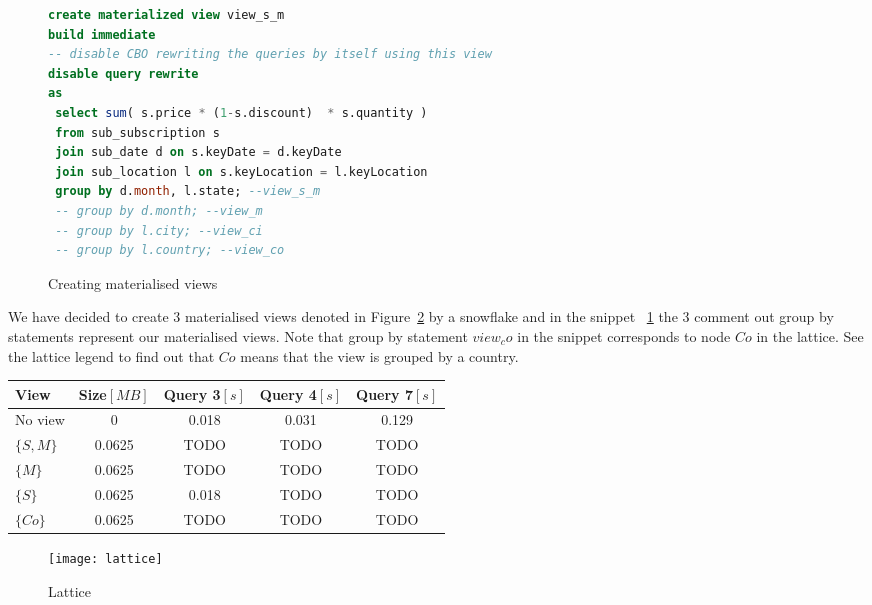 \begin{figure}[!hbp]
\begin{lstlisting}[language=sql] 
create materialized view view_s_m 
build immediate  
-- disable CBO rewriting the queries by itself using this view
disable query rewrite 
as 
 select sum( s.price * (1-s.discount)  * s.quantity )  
 from sub_subscription s
 join sub_date d on s.keyDate = d.keyDate
 join sub_location l on s.keyLocation = l.keyLocation
 group by d.month, l.state; --view_s_m
 -- group by d.month; --view_m
 -- group by l.city; --view_ci
 -- group by l.country; --view_co

\end{lstlisting}
\caption{\label{s:views}  Creating materialised views}
\end{figure}

We have decided to create 3 materialised views denoted in Figure~\ref{fig:lattice}
by a snowflake and in the snippet ~\ref{s:views} the 3 comment out group by statements represent 
our materialised views. Note that group by statement  $view_co$ in the snippet 
corresponds to node ${Co}$ in the lattice. See the lattice legend to find out that ${Co}$ means that
the view is grouped by a country.

\begin{tabular}{|l|c|c|c|c|}
\hline
View & Size$[MB]$& Query 3$[s]$ & Query 4$[s]$ & Query 7$[s]$\\
\hline
\hline
No view & 0 & 0.018 & 0.031 & 0.129 \\
$\{S,M\}$ & 0.0625 & TODO & TODO & TODO\\
$\{M\}$ & 0.0625 & TODO & TODO & TODO\\
$\{S\}$ & 0.0625 & 0.018 & TODO & TODO\\
$\{Co\}$ & 0.0625 & TODO & TODO & TODO\\
\hline
\end{tabular}


\begin{figure}[!hbp]
\begin{center}
  \texttt{[image: lattice]}
\caption{\label{fig:lattice}  Lattice}
\end{center}
\end{figure}



